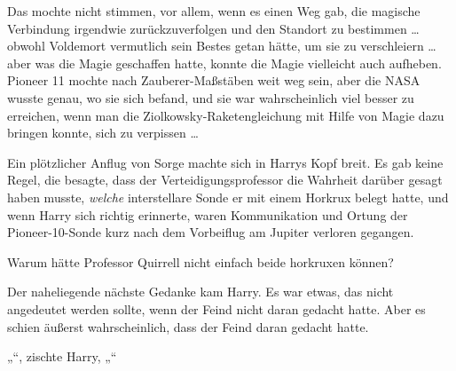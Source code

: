 Das mochte nicht stimmen, vor allem, wenn es einen Weg gab, die magische Verbindung irgendwie zurückzuverfolgen und den Standort zu bestimmen … obwohl Voldemort vermutlich sein Bestes getan hätte, um sie zu verschleiern … aber was die Magie geschaffen hatte, konnte die Magie vielleicht auch aufheben. Pioneer 11 mochte nach Zauberer-Maßstäben weit weg sein, aber die NASA wusste genau, wo sie sich befand, und sie war wahrscheinlich viel besser zu erreichen, wenn man die Ziolkowsky-Raketengleichung mit Hilfe von Magie dazu bringen konnte, sich zu verpissen …

Ein plötzlicher Anflug von Sorge machte sich in Harrys Kopf breit. Es gab keine Regel, die besagte, dass der Verteidigungsprofessor die Wahrheit darüber gesagt haben musste, \emph{welche} interstellare Sonde er mit einem Horkrux belegt hatte, und wenn Harry sich richtig erinnerte, waren Kommunikation und Ortung der Pioneer-10-Sonde kurz nach dem Vorbeiflug am Jupiter verloren gegangen.

Warum hätte Professor Quirrell nicht einfach beide horkruxen können?

Der naheliegende nächste Gedanke kam Harry. Es war etwas, das nicht angedeutet werden sollte, wenn der Feind nicht daran gedacht hatte. Aber es schien äußerst wahrscheinlich, dass der Feind daran gedacht hatte.

„“, zischte Harry, „“


